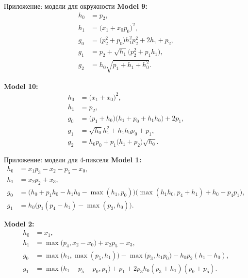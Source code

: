 \documentclass{beamer}
\begin{document}
\begin{frame}{Приложение: модели для окружности}
    \textbf{Model 9:}
    \begin{align*}
    h_0 &= p_2,\\
    h_1 &= \bigl(x_1 + x_0p_0\bigr)^2,\\
    g_0 &= \bigl(p_2^2 + p_0\bigr)h_1^2p_2^2 + 2h_1 + p_2,\\
    g_1 &= p_2 + \sqrt{h_1}\bigl(p_2^2 + p_1h_1\bigr),\\
    g_2 &= h_0\sqrt{p_1 + h_1 + h_0^2}.
    \end{align*}
    
    \textbf{Model 10:}
    \begin{align*}
    h_0 &= \bigl(x_1 + x_0\bigr)^2,\\
    h_1 &= p_2,\\
    g_0 &= \bigl(p_1 + h_0\bigr)\bigl(h_1 + p_0 + h_1h_0\bigr) + 2p_1,\\
    g_1 &= \sqrt{h_0}h_1^2 + h_1h_0p_0 + p_1,\\
    g_2 &= h_0p_0 + p_1\bigl(h_1 + p_2\bigr)\sqrt{h_0}.
    \end{align*}
\end{frame}
\begin{frame}{Приложение: модели для 4-пикселя}
    \textbf{Model 1:}
    \begin{align*}
    h_0 &= x_1p_3 -x_2  - p_5 - x_0,\\
    h_1 &= x_2 p_2 + x_3,\\
    g_0 &= \bigl(h_0 + p_1h_0 - h_1h_0 - \max(h_1,p_0)\bigr)\bigl(\max(h_1h_0,p_4 + h_1) + h_0 + p_4p_1\bigr),\\
    g_1 &= h_0\bigl(p_1(p_4 - h_1) - \max(p_3,h_0)\bigr).
    \end{align*}
    
    \textbf{Model 2:}
    \begin{align*}
    h_0 &= x_1,\\
    h_1 &= \max\bigl(p_4,x_2 - x_0\bigr) + x_2p_5 - x_3,\\
    g_0 &= \max\bigl(h_1,\max(p_5,h_1)\bigr) - \max\bigl(p_3, h_1 p_0\bigr) - h_0 p_2(h_1 - h_0),\\
    g_1 &= \max\bigl(h_1 - p_5 - p_0,p_1\bigr) + p_1 + 2p_3h_0(p_3 + h_1)(p_0 + p_5).
    \end{align*}
\end{frame}
\end{document}

